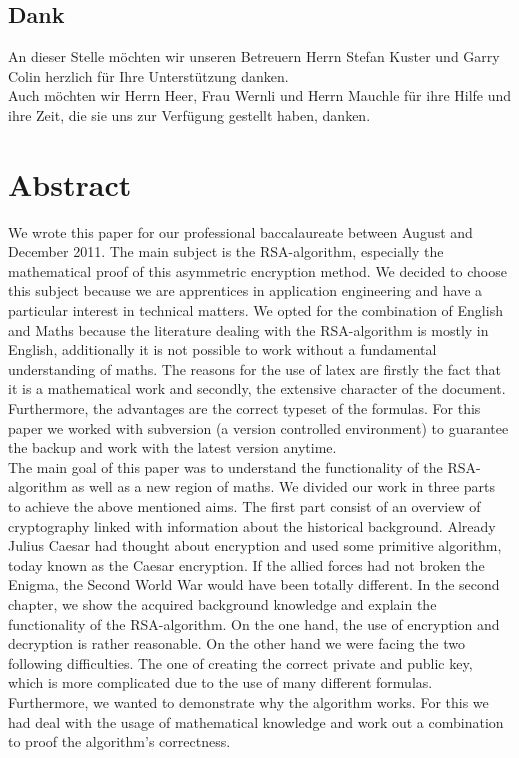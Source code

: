 \subsection{Dank}
An dieser Stelle möchten wir unseren Betreuern Herrn Stefan Kuster und Garry Colin herzlich für Ihre Unterstützung danken.\\
Auch möchten wir Herrn Heer, Frau Wernli und Herrn Mauchle für ihre Hilfe und ihre Zeit, die sie uns zur Verfügung gestellt haben, danken.
\newpage
\section{Abstract}
We wrote this paper for our professional baccalaureate between August and December 2011. The main subject is the RSA-algorithm, especially the mathematical proof of this asymmetric encryption method. We decided to choose this subject because we are apprentices in application engineering and have a particular interest in technical matters. We opted for the combination of English and Maths because the literature dealing with the RSA-algorithm is mostly in English, additionally it is not possible to work without a fundamental understanding of maths. The reasons for the use of latex are firstly the fact that it is a mathematical work and secondly, the extensive character of the document. Furthermore, the advantages are the correct typeset of the formulas. For this paper we worked with subversion (a version controlled environment) to guarantee the backup and work with the latest version anytime. \\
The main goal of this paper was to understand the functionality of the RSA-algorithm as well as a new region of maths. We divided our work in three parts to achieve the above mentioned aims. The first part consist of an overview of cryptography linked with information about the historical background. Already Julius Caesar had thought about encryption and used some primitive algorithm, today known as the Caesar encryption. If the allied forces had not broken the Enigma, the Second World War would have been totally different. %
In the second chapter, we show the acquired background knowledge and explain the functionality of the RSA-algorithm. 
On the one hand, the use of encryption and decryption is rather reasonable. On the other hand we were facing the two following difficulties. The one of creating the correct private and public key, which is more complicated due to the use of many different formulas. Furthermore, we wanted to demonstrate why the algorithm works. For this we had deal with the usage of mathematical knowledge and work out a combination to proof the algorithm's correctness. 
